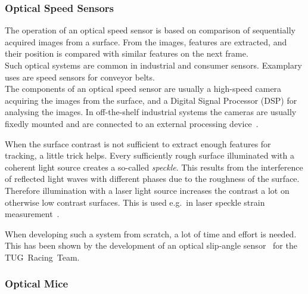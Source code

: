 \documentclass[12pt,a4paper]{article}
\begin{document}



\subsubsection{Optical Speed Sensors}

The operation of an optical speed sensor is based on comparison of sequentially acquired images from a surface.
From the images, features are extracted, and their position is compared with similar features on the next frame.\\
Such optical systems are common in industrial and consumer sensors.
Examplary uses are speed sensors for conveyor belts.\\
The components of an optical speed sensor are usually a high-speed camera acquiring the images from the surface, and a Digital Signal Processor (DSP) for analysing the images.
In off-the-shelf industrial systems the cameras are usually fixedly mounted and are connected to an external processing device~\cite{opt_vel}.

When the surface contrast is not sufficient to extract enough features for tracking, a little trick helps.
Every sufficiently rough surface illuminated with a coherent light source creates a so-called \emph{speckle}.
This results from the interference of reflected light waves with different phases due to the roughness of the surface.
Therefore illumination with a laser light source increases the contrast a lot on otherwise low contrast surfaces.
This is used e.g.\ in laser speckle strain measurement~\cite{strain}.

When developing such a system from scratch, a lot of time and effort is needed.
This has been shown by the development of an optical slip-angle sensor~\cite{Hrach2006} for the TUG~Racing~Team.

\subsubsection{Optical Mice}
\end{document}
